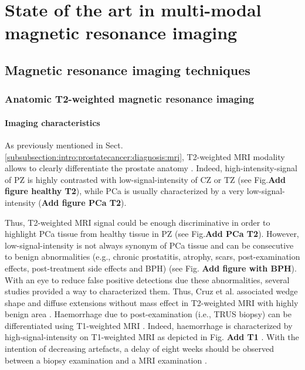 
\chapter{State of the art in multi-modal magnetic resonance imaging} %



\section{Magnetic resonance imaging techniques}\label{section:stateart:mritechniques}

\subsection{Anatomic T2-weighted magnetic resonance imaging}\label{subsection:stateart:t2}

\subsubsection{Imaging characteristics}

As previously mentioned in Sect. \ref{subsubsection:intro:prostatecancer:diagnosis:mri}, T2-weighted MRI modality allows to clearly differentiate the prostate anatomy \cite{Hricak1987, Hoeks2011}. Indeed, high-intensity-signal of PZ is highly contrasted with low-signal-intensity of CZ or TZ \cite{Hoeks2011} (see Fig.\textbf{Add figure healthy T2}), while PCa is usually characterized by a very low-signal-intensity (\textbf{Add figure PCa T2}). 

Thus, T2-weighted MRI signal could be enough discriminative in order to highlight PCa tissue from healthy tissue in PZ (see Fig.\textbf{Add PCa T2}). However, low-signal-intensity is not always synonym of PCa tissue and can be consecutive to benign abnormalities (e.g., chronic prostatitis, atrophy, scars, post-examination effects, post-treatment side effects and BPH) \cite{Kirkham2006} (see Fig. \textbf{Add figure with BPH}). With an eye to reduce false positive detections due these abnormalities, several studies provided a way to characterized them. Thus, Cruz et al. associated wedge shape and diffuse extensions without mass effect in T2-weighted MRI with highly benign area \cite{Cruz2002}. Haemorrhage due to post-examination (i.e., TRUS biopsy) can be differentiated using T1-weighted MRI \cite{Kaji1998}. Indeed, haemorrhage is characterized by high-signal-intensity on T1-weighted MRI as depicted in Fig. \textbf{Add T1} \cite{Kaji1998}. With the intention of decreasing artefacts, a delay of eight weeks should be observed between a biopsy examination and a MRI examination \cite{Qayyum2004}.

